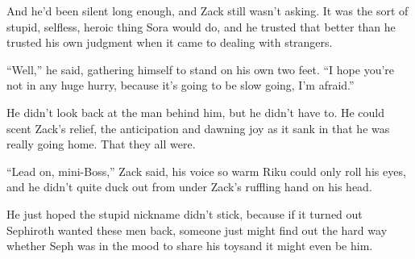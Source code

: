 And he'd been silent long enough, and Zack still wasn't asking. It was the sort of stupid, selfless, heroic thing Sora would do, and he trusted that better than he trusted his own judgment when it came to dealing with strangers.

``Well,'' he said, gathering himself to stand on his own two feet. ``I hope you're not in any huge hurry, because it's going to be slow going, I'm afraid.''

He didn't look back at the man behind him, but he didn't have to. He could scent Zack's relief, the anticipation and dawning joy as it sank in that he was really going home. That they all were.

``Lead on, mini-Boss,'' Zack said, his voice so warm Riku could only roll his eyes, and he didn't quite duck out from under Zack's ruffling hand on his head.

He just hoped the stupid nickname didn't stick, because if it turned out Sephiroth wanted these men back, someone just might find out the hard way whether Seph was in the mood to share his toys\textemdash and it might even be him.